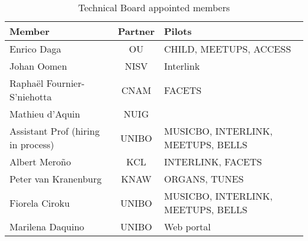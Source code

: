 \begin{table}[htb]
    \caption{Technical Board appointed members}
    \label{tab:tbmembers}
    \centering
    \begin{tabular}{|p{5cm}|c|l|}\hline
\textbf{Member} &	\textbf{Partner} &	\textbf{Pilots} \\\hline
Enrico Daga & OU & CHILD, MEETUPS, ACCESS \\\hline
Johan Oomen & NISV &	Interlink \\\hline
Raphaël Fournier-S'niehotta &	CNAM &	FACETS \\\hline
Mathieu d'Aquin &	NUIG & \\\hline 
Assistant Prof (hiring in process) &	UNIBO &	MUSICBO, INTERLINK, MEETUPS, BELLS	 \\\hline
Albert Meroño &	KCL & INTERLINK, FACETS \\\hline
Peter van Kranenburg &	KNAW &	ORGANS, TUNES \\\hline
Fiorela Ciroku &	UNIBO &	MUSICBO, INTERLINK, MEETUPS, BELLS \\\hline
Marilena Daquino &	UNIBO &	Web portal \\\hline
    \end{tabular}
\end{table}

